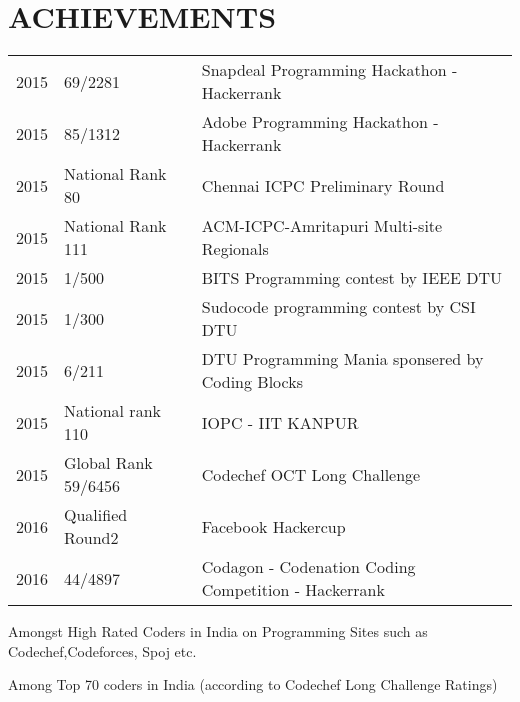\documentclass[]{deedy-resume-openfont}
\begin{document}
\begin{minipage}[t]{0.66\textwidth}
\section{ACHIEVEMENTS} 
\begin{tabular}{rll}
2015	     &  69/2281  & Snapdeal Programming Hackathon - Hackerrank\\
2015	     &  85/1312  & Adobe Programming Hackathon - Hackerrank\\
2015     & National Rank 80 & Chennai ICPC Preliminary Round  \\
2015     & National Rank 111 & ACM-ICPC-Amritapuri Multi-site Regionals\\
2015     & 1/500 & BITS Programming contest by IEEE DTU\\
2015     & 1/300 & Sudocode programming contest by CSI DTU\\
2015     & 6/211 & DTU Programming Mania sponsered by Coding Blocks\\
2015     & National rank 110 & IOPC - IIT KANPUR\\
2015     & Global Rank 59/6456 & Codechef OCT Long Challenge\\
2016	     &  Qualified Round2 & Facebook Hackercup\\
2016	     &  44/4897  & Codagon - Codenation Coding Competition - Hackerrank\\
\end{tabular}
\begin{tightemize}
\item Amongst High Rated Coders in India on Programming Sites such as Codechef,Codeforces, Spoj etc.
\item Among Top 70 coders in India (according to Codechef Long Challenge Ratings)
\end{tightemize}

\sectionsep


\sectionsep

\end{minipage} 
\end{document}
